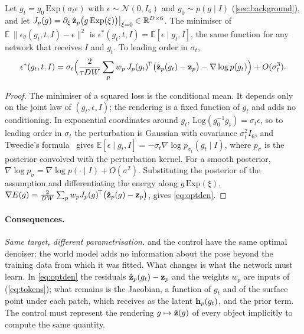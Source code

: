 \begin{proposition}\label{prop:score}
Let $g_t=g_0\,\mathrm{Exp}(\sigma_t\epsilon)$ with $\epsilon\sim\mathcal N(0,I_6)$ and $g_0\sim p(g\mid I)$ (\cref{sec:background}),
and let $J_p(g)=\partial_\xi\,\hat{\mathbf{z}}_p\big(g\,\mathrm{Exp}(\xi)\big)\big|_{\xi=0}\in\mathbb R^{D\times 6}$. The minimiser of
$\mathbb E\,\|\epsilon_\theta(g_t,t,I)-\epsilon\|^2$ is $\epsilon^\ast(g_t,t,I)=\mathbb E[\epsilon\mid g_t,I]$, the same function for
any network that receives $I$ and $g_t$. To leading order in $\sigma_t$,
\begin{equation}
\epsilon^\ast(g_t,t,I)=\sigma_t\Big(\frac{2}{\tau DW}\sum_p w_p\,J_p(g_t)^{\!\top}\big(\hat{\mathbf{z}}_p(g_t)-\mathbf{z}_p\big)
-\nabla\log p(g_t)\Big)+O(\sigma_t^3).
\label{eq:optden}
\end{equation}
\end{proposition}

\begin{proof}
The minimiser of a squared loss is the conditional mean. It depends only on the joint law of $(g_t,\epsilon,I)$; the rendering is a
fixed function of $g_t$ and adds no conditioning. In exponential coordinates around $g_t$, $\mathrm{Log}(g_0^{-1}g_t)=\sigma_t\epsilon$,
so to leading order in $\sigma_t$ the perturbation is Gaussian with covariance $\sigma_t^2 I_6$, and Tweedie's
formula~\cite{efron2011tweedie} gives $\mathbb E[\epsilon\mid g_t,I]=-\sigma_t\nabla\log p_{\sigma_t}(g_t\mid I)$, where $p_\sigma$ is
the posterior convolved with the perturbation kernel. For a smooth posterior, $\nabla\log p_\sigma=\nabla\log p(\cdot\mid I)+O(\sigma^2)$.
Substituting the posterior of the assumption and differentiating the energy along $g\,\mathrm{Exp}(\xi)$,
$\nabla E(g)=\frac{2}{DW}\sum_p w_p J_p(g)^{\!\top}\big(\hat{\mathbf{z}}_p(g)-\mathbf{z}_p\big)$, gives \cref{eq:optden}.
\end{proof}

\paragraph{Consequences.}
\emph{Same target, different parametrisation.} \method and the control have the same optimal denoiser: the world model adds no
information about the pose beyond the training data from which it was fitted. What changes is what the network must learn. In
\cref{eq:optden} the residuals $\hat{\mathbf{z}}_p(g_t)-\mathbf{z}_p$ and the weights $w_p$ are inputs of \method (\cref{eq:tokens}); what remains is
the Jacobian, a function of $g_t$ and of the surface point under each patch, which \method receives as the latent $\mathbf{h}_p(g_t)$, and
the prior term. The control must represent the rendering $g\mapsto\hat{\mathbf{z}}(g)$ of every object implicitly to compute the same quantity.


